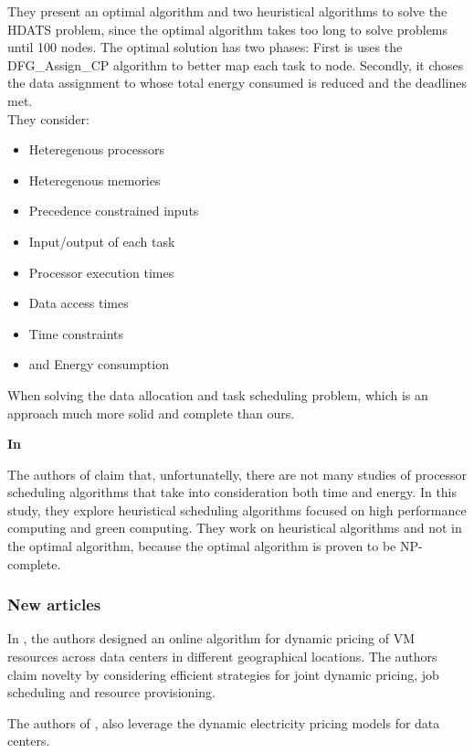 They present an optimal algorithm and two heuristical algorithms to solve the
HDATS problem, since the optimal algorithm takes too long to solve problems
until 100 nodes. The optimal solution has two phases: First is uses the
DFG\_Assign\_CP algorithm to better map each task to node. Secondly, it choses the
data assignment to whose total energy consumed is reduced and the deadlines met.
\\
They consider:
\begin{itemize}
  \item Heteregenous processors 
  \item Heteregenous memories
  \item Precedence constrained inputs
  \item Input/output of each task 
  \item Processor execution times
  \item Data access times
  \item Time constraints 
  \item and Energy consumption
\end{itemize}

When solving the data allocation and task scheduling problem, which is an
approach much more solid and complete than ours.


\textbf{In \cite{EXE_METHOD}}

The authors of \cite{EXE_METHOD} claim that, unfortunatelly, there are not many
studies of processor scheduling algorithms that take into consideration both
time and energy. In this study, they explore heuristical scheduling algorithms
focused on high performance computing and green computing. They work on
heuristical algorithms and not in the optimal algorithm, because the optimal
algorithm is proven to be NP-complete. 


\subsubsection{New articles}

In \cite{DYN_GEO}, the authors designed an online algorithm for dynamic pricing
of VM resources across data centers in different geographical locations. The
authors claim novelty by considering efficient strategies for joint dynamic
pricing, job scheduling and resource provisioning.

The authors of \cite{REDUCING_GEO}, \cite{DYN_POWER} also leverage the dynamic 
electricity pricing models for data centers.

